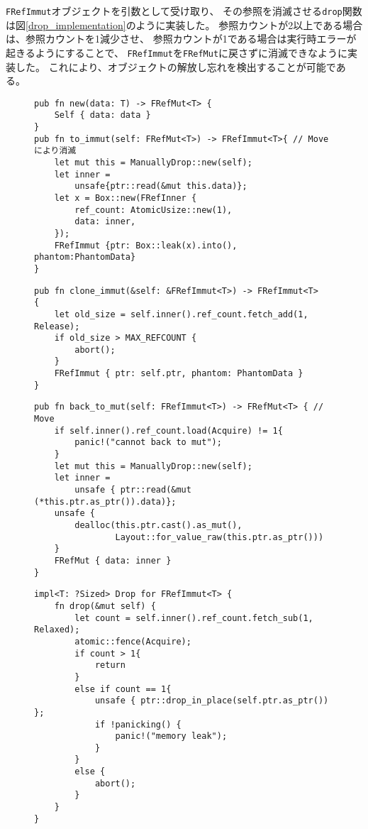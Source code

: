 \documentclass{sumiilab-paper}
\theoremstyle{mystyle}
\numberwithin{definition}{chapter} %
\begin{document}
\texttt{FRefImmut}オブジェクトを引数として受け取り、
その参照を消滅させる\texttt{drop}関数は図\ref{drop_implementation}のように実装した。
参照カウントが2以上である場合は、参照カウントを1減少させ、
参照カウントが1である場合は実行時エラーが起きるようにすることで、
\texttt{FRefImmut}を\texttt{FRefMut}に戻さずに消滅できなように実装した。
これにより、オブジェクトの解放し忘れを検出することが可能である。

\begin{figure}[htp]
\begin{lstlisting}[caption=関数newと関数to\_immutの実装, label=new_to_implementation, captionpos=b]
pub fn new(data: T) -> FRefMut<T> {
    Self { data: data }
}
pub fn to_immut(self: FRefMut<T>) -> FRefImmut<T>{ // Moveにより消滅
    let mut this = ManuallyDrop::new(self);
    let inner =
        unsafe{ptr::read(&mut this.data)};
    let x = Box::new(FRefInner {
        ref_count: AtomicUsize::new(1),
        data: inner,
    });
    FRefImmut {ptr: Box::leak(x).into(), phantom:PhantomData}
}
\end{lstlisting}
\end{figure}

\begin{figure}[htp]
\begin{lstlisting}[caption=関数clone\_immutの実装, label=clone_implementation, captionpos=b]
pub fn clone_immut(&self: &FRefImmut<T>) -> FRefImmut<T>
{
    let old_size = self.inner().ref_count.fetch_add(1, Release);
    if old_size > MAX_REFCOUNT {
        abort();
    }
    FRefImmut { ptr: self.ptr, phantom: PhantomData }
}
\end{lstlisting}
\end{figure}

\begin{figure}[htp]
\begin{lstlisting}[caption=関数back\_to\_mutの実装, label=back_implementation, captionpos=b]
pub fn back_to_mut(self: FRefImmut<T>) -> FRefMut<T> { // Move
    if self.inner().ref_count.load(Acquire) != 1{
        panic!("cannot back to mut");
    }
    let mut this = ManuallyDrop::new(self);
    let inner =
        unsafe { ptr::read(&mut (*this.ptr.as_ptr()).data)};
    unsafe {
        dealloc(this.ptr.cast().as_mut(), 
                Layout::for_value_raw(this.ptr.as_ptr()))
    }
    FRefMut { data: inner }
}
\end{lstlisting}
\end{figure}

\begin{figure}[htp]
\begin{lstlisting}[caption=関数dropの実装, label=drop_implementation, captionpos=b]
impl<T: ?Sized> Drop for FRefImmut<T> {
    fn drop(&mut self) {
        let count = self.inner().ref_count.fetch_sub(1, Relaxed);
        atomic::fence(Acquire);
        if count > 1{
            return
        }
        else if count == 1{
            unsafe { ptr::drop_in_place(self.ptr.as_ptr()) };
            if !panicking() {
                panic!("memory leak");
            }
        }
        else {
            abort();
        }
    }
}
\end{lstlisting}
\end{figure}
\end{document}
